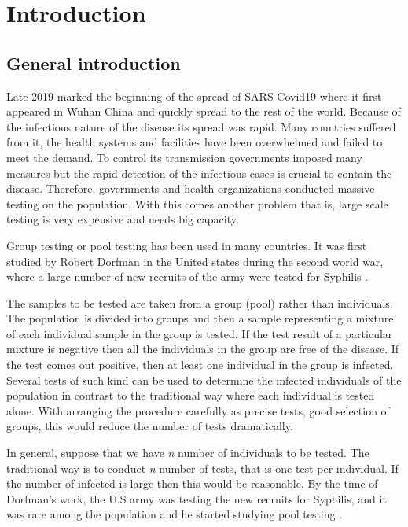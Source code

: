\chapter{Introduction}
%






\section{General introduction}
Late 2019 marked the beginning of the spread of SARS-Covid19 where it first appeared in Wuhan China and quickly spread to the rest of the world. Because of the infectious nature of the disease its spread was rapid. Many countries suffered from it, the health systems and facilities have been overwhelmed and failed to meet the demand. To control its transmission governments imposed many measures but the rapid detection of the infectious cases is crucial to contain the disease. Therefore, governments and health organizations conducted massive testing on the population. With this comes another problem that is, large scale testing is very expensive and needs big capacity.  

Group  testing or pool testing has been used in many countries. It was first studied by Robert Dorfman in the United states during the second world war, where a large number of new recruits of the army were tested for Syphilis \cite{kubook}.

The samples to be tested are taken from a group (pool) rather than individuals. The population is divided into groups and then a sample representing a mixture of each individual sample in the group is tested. If the test result of a particular mixture is negative then all the individuals in the group are free of the disease. If the test comes out positive, then at least one individual in the group is infected. Several tests of such kind can be used to determine the infected individuals of the population in contrast to the traditional way where each individual is tested alone. With arranging the procedure carefully as precise tests, good selection of groups, this would reduce the number of tests dramatically.       

In general, suppose that we have \textit{n} number of individuals to be tested. The traditional way is to conduct \textit{n} number of tests, that is one test per individual. If the number of infected is large then this would be reasonable. By the time of Dorfman's work, the U.S army was testing the new recruits for Syphilis, and it was rare among the population and he started studying pool testing \cite{aldridge}.


